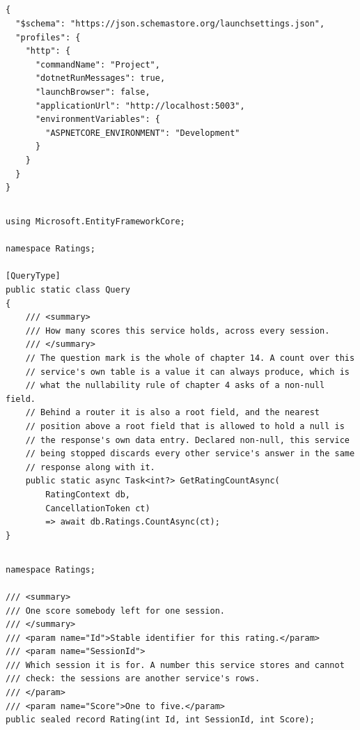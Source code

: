 \subsection*{}
\begin{verbatim}
{
  "$schema": "https://json.schemastore.org/launchsettings.json",
  "profiles": {
    "http": {
      "commandName": "Project",
      "dotnetRunMessages": true,
      "launchBrowser": false,
      "applicationUrl": "http://localhost:5003",
      "environmentVariables": {
        "ASPNETCORE_ENVIRONMENT": "Development"
      }
    }
  }
}
\end{verbatim}

\subsection*{}
\begin{verbatim}
using Microsoft.EntityFrameworkCore;

namespace Ratings;

[QueryType]
public static class Query
{
    /// <summary>
    /// How many scores this service holds, across every session.
    /// </summary>
    // The question mark is the whole of chapter 14. A count over this
    // service's own table is a value it can always produce, which is
    // what the nullability rule of chapter 4 asks of a non-null field.
    // Behind a router it is also a root field, and the nearest
    // position above a root field that is allowed to hold a null is
    // the response's own data entry. Declared non-null, this service
    // being stopped discards every other service's answer in the same
    // response along with it.
    public static async Task<int?> GetRatingCountAsync(
        RatingContext db,
        CancellationToken ct)
        => await db.Ratings.CountAsync(ct);
}
\end{verbatim}

\subsection*{}
\begin{verbatim}
namespace Ratings;

/// <summary>
/// One score somebody left for one session.
/// </summary>
/// <param name="Id">Stable identifier for this rating.</param>
/// <param name="SessionId">
/// Which session it is for. A number this service stores and cannot
/// check: the sessions are another service's rows.
/// </param>
/// <param name="Score">One to five.</param>
public sealed record Rating(int Id, int SessionId, int Score);
\end{verbatim}

